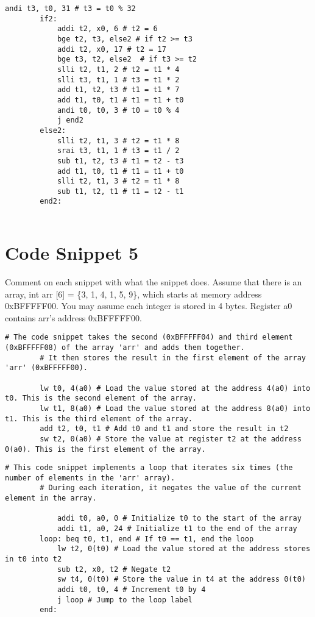 \documentclass[12pt]{article}
\begin{document}
    \begin{lstlisting}[language=RISCV]
        andi t3, t0, 31 # t3 = t0 % 32
        if2:
            addi t2, x0, 6 # t2 = 6 
            bge t2, t3, else2 # if t2 >= t3
            addi t2, x0, 17 # t2 = 17
            bge t3, t2, else2  # if t3 >= t2
            slli t2, t1, 2 # t2 = t1 * 4
            slli t3, t1, 1 # t3 = t1 * 2
            add t1, t2, t3 # t1 = t1 * 7
            add t1, t0, t1 # t1 = t1 + t0
            andi t0, t0, 3 # t0 = t0 % 4
            j end2
        else2:
            slli t2, t1, 3 # t2 = t1 * 8
            srai t3, t1, 1 # t3 = t1 / 2
            sub t1, t2, t3 # t1 = t2 - t3
            add t1, t0, t1 # t1 = t1 + t0
            slli t2, t1, 3 # t2 = t1 * 8
            sub t1, t2, t1 # t1 = t2 - t1
        end2:
        
    \end{lstlisting}

    \newpage
    \section{Code Snippet 5}
    \begin{flushleft}
        Comment on each snippet with what the snippet does. Assume that there is an
        array, int arr [6] = \{3, 1, 4, 1, 5, 9\}, which starts at memory address
        0xBFFFFF00. You may assume each integer is stored in 4 bytes. Register a0 contains
        arr's address 0xBFFFFF00.
    \end{flushleft}
    \begin{lstlisting}[language=RISCV]
        # The code snippet takes the second (0xBFFFFF04) and third element (0xBFFFFF08) of the array 'arr' and adds them together.
        # It then stores the result in the first element of the array 'arr' (0xBFFFFF00).

        lw t0, 4(a0) # Load the value stored at the address 4(a0) into t0. This is the second element of the array.
        lw t1, 8(a0) # Load the value stored at the address 8(a0) into t1. This is the third element of the array.
        add t2, t0, t1 # Add t0 and t1 and store the result in t2
        sw t2, 0(a0) # Store the value at register t2 at the address 0(a0). This is the first element of the array.
    \end{lstlisting}

    \begin{lstlisting}[language=RISCV]
        # This code snippet implements a loop that iterates six times (the number of elements in the 'arr' array). 
        # During each iteration, it negates the value of the current element in the array.

            addi t0, a0, 0 # Initialize t0 to the start of the array
            addi t1, a0, 24 # Initialize t1 to the end of the array
        loop: beq t0, t1, end # If t0 == t1, end the loop
            lw t2, 0(t0) # Load the value stored at the address stores in t0 into t2
            sub t2, x0, t2 # Negate t2
            sw t4, 0(t0) # Store the value in t4 at the address 0(t0)
            addi t0, t0, 4 # Increment t0 by 4
            j loop # Jump to the loop label
        end:
    \end{lstlisting}
\end{document}
